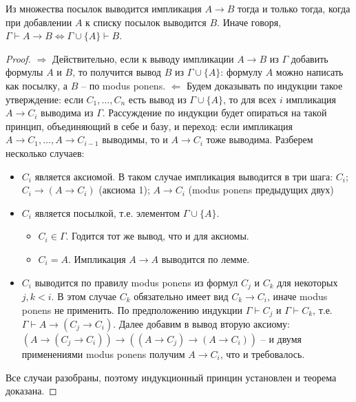 \begin{theorem}
  Из множества посылок выводится импликация $A \to B$ тогда и только тогда, когда при добавлении $A$ к списку посылок выводится $B$. Иначе говоря, $\Gamma \vdash A \to B \Leftrightarrow \Gamma \cup \{A\} \vdash B$.
  \begin{proof}
    $\Rightarrow$ \newline
    Действительно, если к выводу импликации $A \to B$ из $\Gamma$ добавить формулы $A$ и $B$, то получится вывод $B$ из $\Gamma \cup \{A\}$: формулу $A$ можно написать как посылку, а $B$ -- по modus ponens. \newline
    $\Leftarrow$ \newline
    Будем доказывать по индукции такое утверждение: если $C_1, \dots, C_n$ есть вывод из $\Gamma \cup \{A\}$, то для всех $i$ импликация $A \to C_i$ выводима из $\Gamma$. Рассуждение по индукции будет опираться на такой принцип, объединяющий в себе и базу, и переход: если импликация $A \to C_1, \dots, A \to C_{i-1}$ выводимы, то и $A \to C_i$ тоже выводима. Разберем несколько случаев:
    \begin{itemize}
      \item $C_i$ является аксиомой. В таком случае импликация выводится в три шага: $C_i$; $C_i \to (A \to C_i)$ (аксиома 1); $A \to C_i$ (modus ponens предыдущих двух)
      \item $C_i$ является посылкой, т.е. элементом $\Gamma \cup \{A\}$.
        \begin{itemize}
          \item $C_i \in \Gamma$. Годится тот же вывод, что и для аксиомы.
          \item $C_i = A$. Импликация $A \to A$ выводится по лемме.
        \end{itemize}
      \item $C_i$ выводится по правилу modus ponens из формул $C_j$ и $C_k$ для некоторых $j,k < i$. В этом случае $C_k$ обязательно имеет вид $C_k \to C_i$, иначе modus ponens не применить. По предположению индукции $\Gamma \vdash C_j$ и $\Gamma \vdash C_k$, т.е. $\Gamma \vdash A \to (C_j \to C_i)$. Далее добавим в вывод вторую аксиому: $(A \to (C_j \to C_i)) \to ((A \to C_j) \to (A \to C_i))$ -- и двумя применениями modus ponens получим $A \to C_i$, что и требовалось.
    \end{itemize}
    Все случаи разобраны, поэтому индукционный принцин установлен и теорема доказана.
  \end{proof}
\end{theorem}

